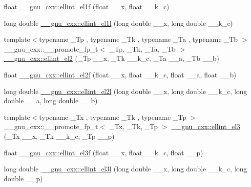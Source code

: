 \begin{DoxyCompactItemize}
\item 
float \hyperlink{group__gnu__math__spec__func_ga8d8342bb4f42c7fe09b5589c54d4e713}{\+\_\+\+\_\+gnu\+\_\+cxx\+::ellint\+\_\+el1f} (float \+\_\+\+\_\+x, float \+\_\+\+\_\+k\+\_\+c)
\item 
long double \hyperlink{group__gnu__math__spec__func_gaeed1201e421be410460739048cba5cd8}{\+\_\+\+\_\+gnu\+\_\+cxx\+::ellint\+\_\+el1l} (long double \+\_\+\+\_\+x, long double \+\_\+\+\_\+k\+\_\+c)
\item 
{\footnotesize template$<$typename \+\_\+\+Tp , typename \+\_\+\+Tk , typename \+\_\+\+Ta , typename \+\_\+\+Tb $>$ }\\\+\_\+\+\_\+gnu\+\_\+cxx\+::\+\_\+\+\_\+promote\+\_\+fp\+\_\+t$<$ \+\_\+\+Tp, \+\_\+\+Tk, \+\_\+\+Ta, \+\_\+\+Tb $>$ \hyperlink{group__gnu__math__spec__func_ga43159d9468e4e31a0fbe391561f195be}{\+\_\+\+\_\+gnu\+\_\+cxx\+::ellint\+\_\+el2} (\+\_\+\+Tp \+\_\+\+\_\+x, \+\_\+\+Tk \+\_\+\+\_\+k\+\_\+c, \+\_\+\+Ta \+\_\+\+\_\+a, \+\_\+\+Tb \+\_\+\+\_\+b)
\item 
float \hyperlink{group__gnu__math__spec__func_ga0bf7469fe7ac92e9a2ffa0f92ea62248}{\+\_\+\+\_\+gnu\+\_\+cxx\+::ellint\+\_\+el2f} (float \+\_\+\+\_\+x, float \+\_\+\+\_\+k\+\_\+c, float \+\_\+\+\_\+a, float \+\_\+\+\_\+b)
\item 
long double \hyperlink{group__gnu__math__spec__func_ga491439a09e6000659444f52dc3c9f215}{\+\_\+\+\_\+gnu\+\_\+cxx\+::ellint\+\_\+el2l} (long double \+\_\+\+\_\+x, long double \+\_\+\+\_\+k\+\_\+c, long double \+\_\+\+\_\+a, long double \+\_\+\+\_\+b)
\item 
{\footnotesize template$<$typename \+\_\+\+Tx , typename \+\_\+\+Tk , typename \+\_\+\+Tp $>$ }\\\+\_\+\+\_\+gnu\+\_\+cxx\+::\+\_\+\+\_\+promote\+\_\+fp\+\_\+t$<$ \+\_\+\+Tx, \+\_\+\+Tk, \+\_\+\+Tp $>$ \hyperlink{group__gnu__math__spec__func_ga57b418ec87f207cdd1c9e5fa48b29333}{\+\_\+\+\_\+gnu\+\_\+cxx\+::ellint\+\_\+el3} (\+\_\+\+Tx \+\_\+\+\_\+x, \+\_\+\+Tk \+\_\+\+\_\+k\+\_\+c, \+\_\+\+Tp \+\_\+\+\_\+p)
\item 
float \hyperlink{group__gnu__math__spec__func_ga66131a8ecc14b5228a73a01121f60a35}{\+\_\+\+\_\+gnu\+\_\+cxx\+::ellint\+\_\+el3f} (float \+\_\+\+\_\+x, float \+\_\+\+\_\+k\+\_\+c, float \+\_\+\+\_\+p)
\item 
long double \hyperlink{group__gnu__math__spec__func_ga0d90e66f799a2ebe4bec43eef0d53355}{\+\_\+\+\_\+gnu\+\_\+cxx\+::ellint\+\_\+el3l} (long double \+\_\+\+\_\+x, long double \+\_\+\+\_\+k\+\_\+c, long double \+\_\+\+\_\+p)

\end{DoxyCompactItemize}
